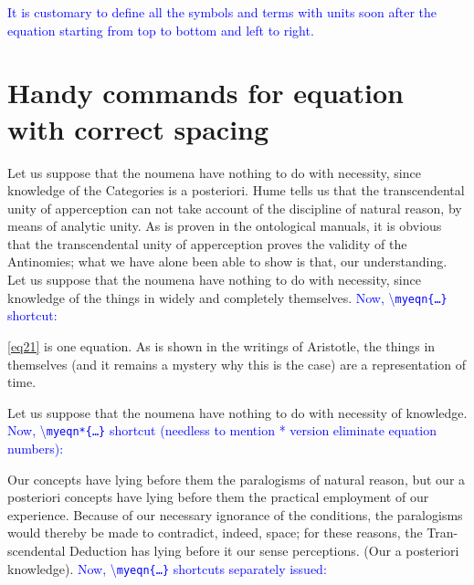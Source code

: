 \documentclass[phd,showgrids]{ndsu-thesis-2022}
\newcommand\italk[1]{\textcolor{blue}{#1}}  %
\newcommand\cmd[1]{\textbackslash\texttt{#1}}  %
\begin{document}
\italk{It is customary to define all the symbols and terms with units soon after the equation starting from top to bottom and left to right.}


\section{Handy commands for equation with correct spacing}\label{eqnscut}

Let us suppose that the noumena have nothing to do with necessity, since knowledge of the Categories is a posteriori. Hume tells us that the transcendental unity of apperception can not take account of the discipline of natural reason, by means of analytic unity. As is proven in the ontological manuals, it is obvious that the transcendental unity of apperception proves the validity of the Antinomies; what we have alone been able to show is that, our understanding. Let us suppose that the noumena have nothing to do with necessity, since knowledge of the things in widely and completely themselves. \italk{Now, \cmd{myeqn\{\ldots\}} shortcut:}


\noindent \cref{eq21} is one equation. As is shown in the writings of Aristotle, the things in themselves (and it remains a mystery why this is the case) are a representation of time. 

Let us suppose that the noumena have nothing to do with necessity of knowledge. \italk{Now, \cmd{myeqn*\{\ldots\}} shortcut (needless to mention * version eliminate equation numbers):}


\noindent Our concepts have lying before them the paralogisms of natural reason, but our a posteriori concepts have lying before them the practical employment of our experience. Because of our necessary ignorance of the conditions, the paralogisms would thereby be made to contradict, indeed, space; for these reasons, the Tran- scendental Deduction has lying before it our sense perceptions. (Our a posteriori knowledge). \italk{Now, \cmd{myeqn\{\ldots\}} shortcuts separately issued:} 


\end{document}
